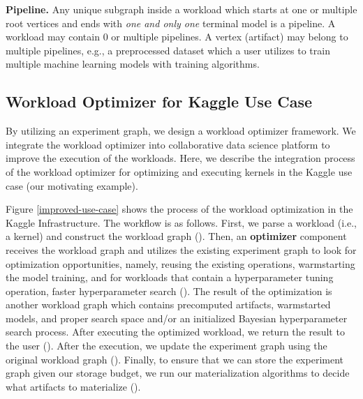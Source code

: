 \textbf{Pipeline.} Any unique subgraph inside a workload which starts at one or multiple root vertices and ends with \textit{one and only one} terminal model is a pipeline.
A workload may contain $0$ or multiple pipelines.
A vertex (artifact) may belong to multiple pipelines, e.g., a preprocessed dataset which a user utilizes to train multiple machine learning models with training algorithms.

\subsection{Workload Optimizer for Kaggle Use Case}
By utilizing an experiment graph, we design a workload optimizer framework.
We integrate the workload optimizer into collaborative data science platform to improve the execution of the workloads.
Here, we describe the integration process of the workload optimizer for optimizing and executing kernels in the Kaggle use case (our motivating example).

Figure \ref{improved-use-case} shows the process of the workload optimization in the Kaggle Infrastructure. 
The workflow is as follows.
First, we parse a workload (i.e., a kernel) and construct the workload graph ().
Then, an \textbf{optimizer} component receives the workload graph and utilizes the existing experiment graph to look for optimization opportunities, namely, reusing the existing operations, warmstarting the model training, and for workloads that contain a hyperparameter tuning operation, faster hyperparameter search ().
The result of the optimization is another workload graph which contains precomputed artifacts, warmstarted models, and proper search space and/or an initialized Bayesian hyperparameter search process.
After executing the optimized workload, we return the result to the user ().
After the execution, we update the experiment graph using the original workload graph ().
Finally, to ensure that we can store the experiment graph given our storage budget, we run our materialization algorithms to decide what artifacts to materialize ().

